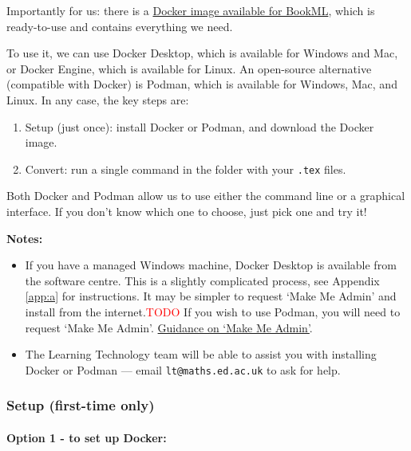 Importantly for us: there is a \href{https://github.com/vlmantova/bookml/pkgs/container/bookml}{Docker image available for BookML}, which is ready-to-use and contains everything we need.

To use it, we can use Docker Desktop, which is available for Windows and Mac, or Docker Engine, which is available for Linux. An open-source alternative (compatible with Docker) is Podman, which is available for Windows, Mac, and Linux. In any case, the key steps are:

\begin{enumerate}
    \item Setup (just once): install Docker or Podman, and download the Docker image.
    \item Convert: run a single command in the folder with your \verb|.tex| files.
\end{enumerate}

Both Docker and Podman allow us to use either the command line or a graphical interface. If you don't know which one to choose, just pick one and try it!

\noindent \textbf{Notes: }
\begin{itemize}
    \item If you have a managed Windows machine, Docker Desktop is available from the software centre. This is a slightly complicated process, 
    see Appendix \ref{app:a} for instructions. It may be simpler to request `Make Me Admin' and install from the internet.\textcolor{red}{TODO}
    If you wish to use Podman, you will need to request `Make Me Admin'.
    \href{https://www.ed.ac.uk/information-services/computing/desktop-personal/supported/windows-10/makemeadmin}{Guidance on `Make Me Admin'}.
    \item The Learning Technology team will be able to assist you with installing Docker or Podman --- email \verb|lt@maths.ed.ac.uk| to ask for help.
\end{itemize}

\subsubsection{Setup (first-time only)}
\label{sssec:setup}

\paragraph{Option 1 - to set up Docker:}


